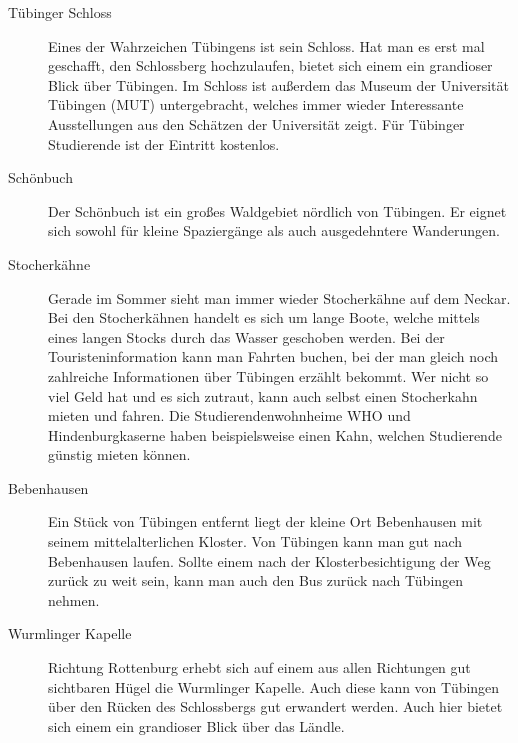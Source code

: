 \begin{description}
\item[Tübinger Schloss] Eines der Wahrzeichen Tübingens ist sein Schloss. Hat man es erst mal geschafft, den Schlossberg hochzulaufen, bietet sich einem ein grandioser Blick über Tübingen. Im Schloss ist außerdem das Museum der Universität Tübingen (MUT) untergebracht, welches immer wieder Interessante Ausstellungen aus den Schätzen der Universität zeigt. Für Tübinger Studierende ist der Eintritt kostenlos.

\item[Schönbuch] Der Schönbuch ist ein großes Waldgebiet nördlich von Tübingen. Er eignet sich sowohl für kleine Spaziergänge als auch ausgedehntere Wanderungen.

\item[Stocherkähne]
Gerade im Sommer sieht man immer wieder Stocherkähne auf dem Neckar. Bei den Stocherkähnen handelt es sich um lange Boote, welche mittels eines langen Stocks durch das Wasser geschoben werden. Bei der Touristeninformation kann man Fahrten buchen, bei der man gleich noch zahlreiche Informationen über Tübingen erzählt bekommt. Wer nicht so viel Geld hat und es sich zutraut, kann auch selbst einen Stocherkahn mieten und fahren. Die Studierendenwohnheime WHO und Hindenburgkaserne haben beispielsweise einen Kahn, welchen Studierende günstig mieten können.


\item[Bebenhausen]
Ein Stück von Tübingen entfernt liegt der kleine Ort Bebenhausen mit seinem mittelalterlichen Kloster. Von Tübingen kann man gut nach Bebenhausen laufen. Sollte einem nach der Klosterbesichtigung der Weg zurück zu weit sein, kann man auch den Bus zurück nach Tübingen nehmen.

\item[Wurmlinger Kapelle]
Richtung Rottenburg erhebt sich auf einem aus allen Richtungen gut sichtbaren Hügel die Wurmlinger Kapelle. Auch diese kann von Tübingen über den Rücken des Schlossbergs gut erwandert werden. Auch hier bietet sich einem ein grandioser Blick über das Ländle.



\end{description}
